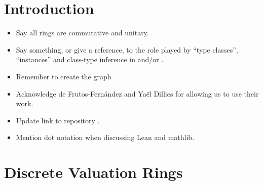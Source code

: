\documentclass[sigplan,10pt,anonymous,review]{acmart}
\begin{document}
\section{Introduction}
\begin{itemize}
\item Say all rings are commutative and unitary.
\item Say something, or give a reference, to the role played by ``type classes'', ``instances'' and class-type inference in \lean and/or \mathlib.
\item Remember to create the graph
\item Acknowledge de Frutos-Fernández and Yaël Dillies for allowing us to use their work.
\item Update link to repository \href{https://github.com/mariainesdff/local_class_field_theory}{\extlink}.
\item Mention dot notation when discussing Lean and mathlib.

\end{itemize}
\section {Discrete Valuation Rings}\label{section:dvr}
\end{document}
